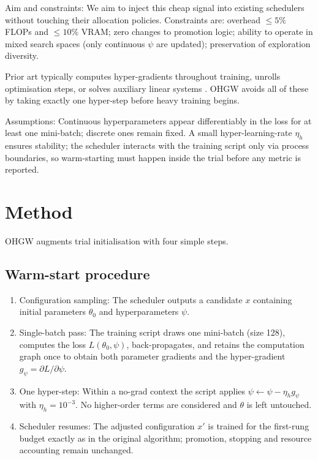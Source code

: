 \documentclass{article}
\begin{document}
Aim and constraints: We aim to inject this cheap signal into existing schedulers without touching their allocation policies. Constraints are: overhead \(\leq 5 \%\) FLOPs and \(\leq 10 \%\) VRAM; zero changes to promotion logic; ability to operate in mixed search spaces (only continuous \(\psi\) are updated); preservation of exploration diversity.

Prior art typically computes hyper-gradients throughout training, unrolls optimisation steps, or solves auxiliary linear systems \cite{bertrand-2020-implicit,immer-2023-stochastic}. OHGW avoids all of these by taking exactly one hyper-step before heavy training begins.

Assumptions: Continuous hyperparameters appear differentiably in the loss for at least one mini-batch; discrete ones remain fixed. A small hyper-learning-rate \(\eta_h\) ensures stability; the scheduler interacts with the training script only via process boundaries, so warm-starting must happen inside the trial before any metric is reported.

\section{Method}
OHGW augments trial initialisation with four simple steps.

\subsection{Warm-start procedure}
\begin{enumerate}
  \item Configuration sampling: The scheduler outputs a candidate \(x\) containing initial parameters \(\theta_0\) and hyperparameters \(\psi\).
  \item Single-batch pass: The training script draws one mini-batch (size 128), computes the loss \(L(\theta_0,\psi)\), back-propagates, and retains the computation graph once to obtain both parameter gradients and the hyper-gradient \(g_\psi = \partial L/\partial \psi\).
  \item One hyper-step: Within a no-grad context the script applies \(\psi \leftarrow \psi - \eta_h g_\psi\) with \(\eta_h = 10^{-3}\). No higher-order terms are considered and \(\theta\) is left untouched.
  \item Scheduler resumes: The adjusted configuration \(x'\) is trained for the first-rung budget exactly as in the original algorithm; promotion, stopping and resource accounting remain unchanged.
\end{enumerate}
\end{document}
